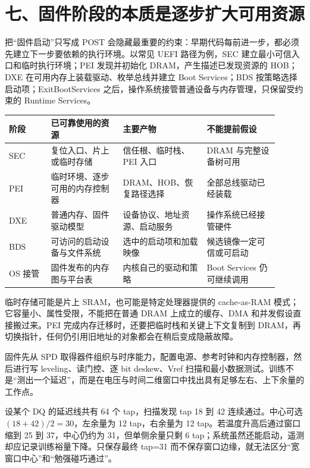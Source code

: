 \section{七、固件阶段的本质是逐步扩大可用资源}

把“固件启动”只写成 POST 会隐藏最重要的约束：早期代码每前进一步，都必须先建立下一步要依赖的执行环境。以常见 UEFI 路径为例，SEC 建立最小可信入口和临时执行环境；PEI 发现并初始化 DRAM，产生描述已发现资源的 HOB；DXE 在可用内存上装载驱动、枚举总线并建立 Boot Services；BDS 按策略选择启动项；ExitBootServices 之后，操作系统接管普通设备与内存管理，只保留受约束的 Runtime Services。

\begin{longtable}{L{0.14\linewidth}L{0.24\linewidth}L{0.28\linewidth}L{0.24\linewidth}}
\toprule
阶段 & 已可靠使用的资源 & 主要产物 & 不能提前假设 \\
\midrule
SEC & 复位入口、片上或临时存储 & 信任根、临时栈、PEI 入口 & DRAM 与完整设备树可用 \\\tablerowrule
PEI & 临时环境、逐步可用的内存控制器 & DRAM、HOB、恢复路径选择 & 全部总线驱动已经装载 \\\tablerowrule
DXE & 普通内存、固件驱动模型 & 设备协议、地址资源、启动服务 & 操作系统已经接管硬件 \\\tablerowrule
BDS & 可访问的启动设备与文件系统 & 选中的启动项和加载映像 & 候选镜像一定可信或可启动 \\\tablerowrule
OS 接管 & 固件发布的内存图与平台表 & 内核自己的驱动和策略 & Boot Services 仍可继续调用 \\
\bottomrule
\end{longtable}

临时存储可能是片上 SRAM，也可能是特定处理器提供的 cache-as-RAM 模式；它容量小、属性受限，不能把在普通 DRAM 上成立的缓存、DMA 和并发假设直接搬过来。PEI 完成内存迁移时，还要把临时栈和关键上下文复制到 DRAM，再切换指针，任何仍引用旧地址的对象都会在稍后变成隐蔽故障。


固件先从 SPD 取得器件组织与时序能力，配置电源、参考时钟和内存控制器，然后进行写 leveling、读门控、逐 bit deskew、Vref 扫描和最小数据测试。训练不是“测出一个延迟”，而是在电压与时间二维窗口中找出具有足够左右、上下余量的工作点。

设某个 DQ 的延迟线共有 64 个 tap，扫描发现 tap 18 到 42 连续通过。中心可选 $(18+42)/2=30$，左余量为 12 tap，右余量为 12 tap。若温度升高后通过窗口缩到 25 到 37，中心仍约为 31，但单侧余量只剩 6 tap；系统虽然还能启动，遥测却应记录训练裕量下降。只保存最终 tap=31 而不保存窗口边缘，就无法区分“宽窗口中心”和“勉强碰巧通过”。

